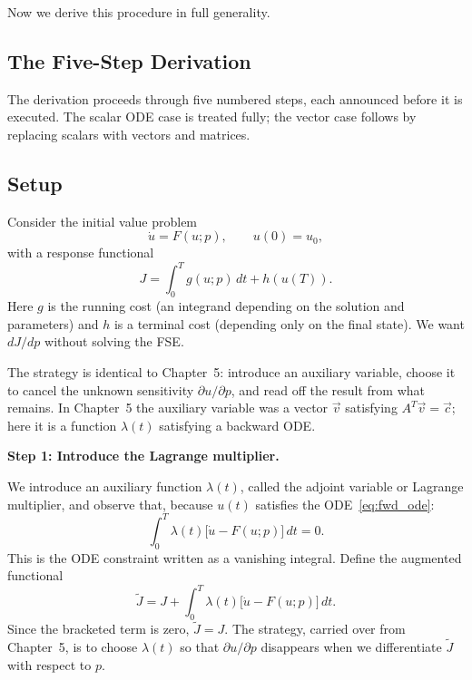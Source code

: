 Now we derive this procedure in full generality.

\subsection{The Five-Step Derivation}

The derivation proceeds through five numbered steps, each announced
before it is executed. The scalar ODE case is treated fully; the
vector case follows by replacing scalars with vectors and matrices.

\subsection{Setup}

Consider the initial value problem
\begin{equation}
  \dot{u} = F(u; p), \qquad u(0) = u_0,
  \label{eq:fwd_ode}
\end{equation}
with a response functional
\begin{equation}
  J = \int_0^T g(u; p)\,dt + h(u(T)).
  \label{eq:functional}
\end{equation}
Here $g$ is the running cost (an integrand depending on the solution
and parameters) and $h$ is a terminal cost (depending only on the
final state). We want $dJ/dp$ without solving the FSE.

\medskip

The strategy is identical to Chapter~5: introduce an auxiliary variable,
choose it to cancel the unknown sensitivity $\partial u/\partial p$,
and read off the result from what remains.
In Chapter~5 the auxiliary variable was a vector $\vec{v}$ satisfying
$A^T\vec{v} = \vec{c}$; here it is a function $\lambda(t)$ satisfying
a backward ODE.

\medskip
\textbf{Step 1: Introduce the Lagrange multiplier.}

We introduce an auxiliary function $\lambda(t)$, called
the adjoint variable or Lagrange multiplier, and observe that,
because $u(t)$ satisfies the ODE~\eqref{eq:fwd_ode}:
\[
  \int_0^T \lambda(t)\bigl[\dot{u} - F(u;p)\bigr]\,dt = 0.
\]
This is the ODE constraint written as a vanishing integral.
Define the augmented functional
\begin{equation}
  \tilde{J} = J + \int_0^T \lambda(t)\bigl[\dot{u} - F(u;p)\bigr]\,dt.
  \label{eq:augmented}
\end{equation}
Since the bracketed term is zero, $\tilde{J} = J$.
The strategy, carried over from Chapter~5, is to choose
$\lambda(t)$ so that $\partial u/\partial p$ disappears when we
differentiate $\tilde{J}$ with respect to $p$.

